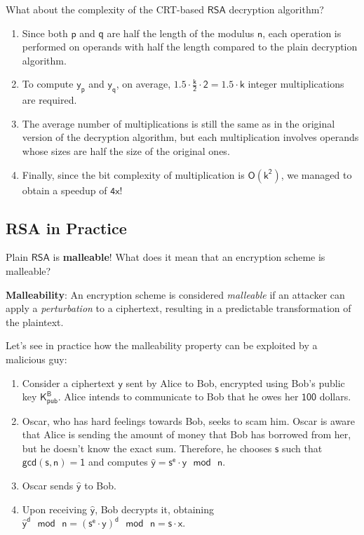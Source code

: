 \documentclass{article}
\begin{document}
\par What about the complexity of the CRT-based $\mathsf{RSA}$ decryption algorithm?

\begin{enumerate}
    \item Since both $\mathsf{p}$ and $\mathsf{q}$ are half the length of the modulus $\mathsf{n}$, each operation is performed on operands with half the length compared to the plain decryption algorithm.
    \item To compute $\mathsf{y_p}$ and $\mathsf{y_q}$, on average, $\mathsf{1.5 \cdot \frac{k}{2} \cdot 2 = 1.5 \cdot k}$ integer multiplications are required.
    \item The average number of multiplications is still the same as in the original version of the decryption algorithm, but each multiplication involves operands whose sizes are half the size of the original ones.
    \item Finally, since the bit complexity of multiplication is $\mathsf{O(k^2)}$, we managed to obtain a speedup of $\mathsf{4x}$!
\end{enumerate}

\subsection{RSA in Practice}
Plain $\mathsf{RSA}$ is \textbf{malleable}! What does it mean that an encryption scheme is malleable?

\begin{boxH}
    \textbf{Malleability}: An encryption scheme is considered \textit{malleable} if an attacker can apply a \textit{perturbation} to a ciphertext, resulting in a predictable transformation of the plaintext.
\end{boxH}

\par \noindent Let's see in practice how the malleability property can be exploited by a malicious guy:

\begin{enumerate}
    \item Consider a ciphertext $\mathsf{y}$ sent by Alice to Bob, encrypted using Bob's public key $\mathsf{K_{pub}^{B}}$. Alice intends to communicate to Bob that he owes her $\mathsf{100}$ dollars.
    \item Oscar, who has hard feelings towards Bob, seeks to scam him. Oscar is aware that Alice is sending the amount of money that Bob has borrowed from her, but he doesn't know the exact sum. Therefore, he chooses $\mathsf{s}$ such that $\mathsf{gcd(s, n) = 1}$ and computes $\mathsf{\hat{y} = s^e \cdot y \text{ } mod \text{ } n}$.
    \item Oscar sends $\mathsf{\hat{y}}$ to Bob.
    \item Upon receiving $\mathsf{\hat{y}}$, Bob decrypts it, obtaining $\mathsf{\hat{y}^d \text{ } mod \text{ }  n = (s^e \cdot y)^d \text{ } mod \text{ }  n = s \cdot x}$.
\end{enumerate}
\end{document}
